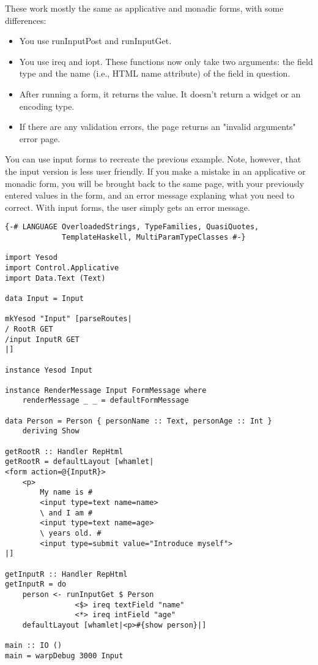 These work mostly the same as applicative and monadic forms, with some differences:
\begin{itemize}
 \item You use runInputPost and runInputGet.
 \item You use ireq and iopt. These functions now only take two arguments: the field type
and the name (i.e., HTML name attribute) of the field in question.
 \item  After running a form, it returns the value. It doesn't return a widget or an
encoding type.
 \item  If there are any validation errors, the page returns an "invalid arguments" error
page.
\end{itemize}
You can use input forms to recreate the previous example. Note, however, that the input
version is less user friendly. If you make a mistake in an applicative or monadic form,
you will be brought back to the same page, with your previously entered values in the
form, and an error message explaning what you need to correct. With input forms, the user
simply gets an error message.

\begin{lstlisting}
{-# LANGUAGE OverloadedStrings, TypeFamilies, QuasiQuotes,
             TemplateHaskell, MultiParamTypeClasses #-}

import Yesod
import Control.Applicative
import Data.Text (Text)

data Input = Input

mkYesod "Input" [parseRoutes|
/ RootR GET
/input InputR GET
|]

instance Yesod Input

instance RenderMessage Input FormMessage where
    renderMessage _ _ = defaultFormMessage

data Person = Person { personName :: Text, personAge :: Int }
    deriving Show

getRootR :: Handler RepHtml
getRootR = defaultLayout [whamlet|
<form action=@{InputR}>
    <p>
        My name is #
        <input type=text name=name>
        \ and I am #
        <input type=text name=age>
        \ years old. #
        <input type=submit value="Introduce myself">
|]

getInputR :: Handler RepHtml
getInputR = do
    person <- runInputGet $ Person
                <$> ireq textField "name"
                <*> ireq intField "age"
    defaultLayout [whamlet|<p>#{show person}|]

main :: IO ()
main = warpDebug 3000 Input
\end{lstlisting}

